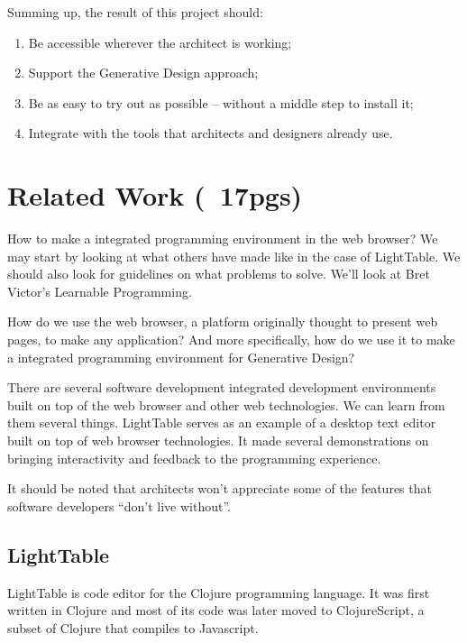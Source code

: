 \documentclass{./llncs2e/llncs}
\begin{document}
	Summing up, the result of this project should:
	\begin{enumerate}
		\item Be accessible wherever the architect is working; \label{obj:access}
		\item Support the Generative Design approach; \label{obj:gen-design}
		\item Be as easy to try out as possible -- without a middle step to install it; \label{obj:no-install}
		\item Integrate with the tools that architects and designers already use.\label{obj:inter-op}
	\end{enumerate}


\section{Related Work (~17pgs)}

	How to make a integrated programming environment in the web browser?
	We may start by looking at what others have made like in the case of LightTable.
	We should also look for guidelines on what problems to solve.
	We'll look at Bret Victor's Learnable Programming.

	How do we use the web browser, a platform originally thought to present web pages, to make any application? 
	And more specifically, how do we use it to make a integrated programming environment for Generative Design?

	There are several software development integrated development environments built on top of the web browser and other web technologies.
	We can learn from them several things.
	LightTable serves as an example of a desktop text editor built on top of web browser technologies.
	It made several demonstrations on bringing interactivity and feedback to the programming experience.

	It should be noted that architects won't appreciate some of the features that software developers ``don't live without''.

\subsection{LightTable}
	LightTable is code editor for the Clojure programming language\cite{hickey2008clojure}. 
	It was first written in Clojure and most of its code was later moved to ClojureScript\cite{10.1109/MIC.2011.148}, a subset of Clojure that compiles to Javascript.
\end{document}
